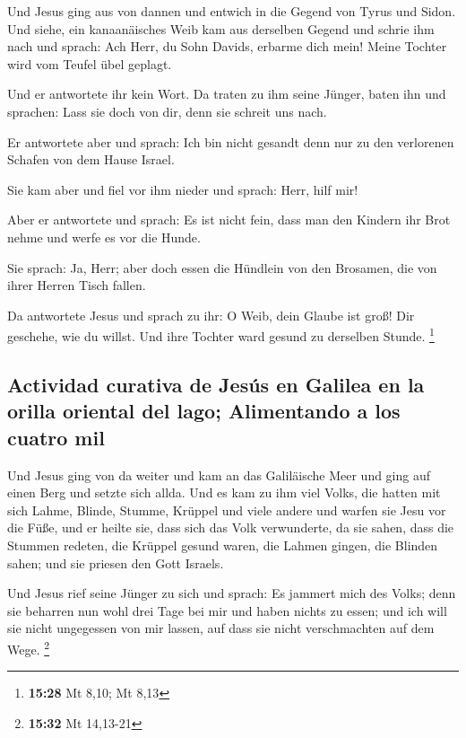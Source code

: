  Und Jesus ging aus von dannen und entwich in die Gegend
von Tyrus und Sidon.  Und siehe, ein kanaanäisches Weib
kam aus derselben Gegend und schrie ihm nach und sprach: Ach Herr, du
Sohn Davids, erbarme dich mein! Meine Tochter wird vom Teufel übel
geplagt.

 Und er antwortete ihr kein Wort. Da traten zu ihm seine
Jünger, baten ihn und sprachen: Lass sie doch von dir, denn sie schreit
uns nach.

 Er antwortete aber und sprach: Ich bin nicht gesandt
denn nur zu den verlorenen Schafen von dem Hause Israel.

 Sie kam aber und fiel vor ihm nieder und sprach: Herr,
hilf mir!

 Aber er antwortete und sprach: Es ist nicht fein, dass
man den Kindern ihr Brot nehme und werfe es vor die Hunde.

 Sie sprach: Ja, Herr; aber doch essen die Hündlein von
den Brosamen, die von ihrer Herren Tisch fallen.

 Da antwortete Jesus und sprach zu ihr: O Weib, dein
Glaube ist groß! Dir geschehe, wie du willst. Und ihre Tochter ward
gesund zu derselben Stunde. \footnote{\textbf{15:28} Mt 8,10; Mt 8,13}

\hypertarget{actividad-curativa-de-jesuxfas-en-galilea-en-la-orilla-oriental-del-lago-alimentando-a-los-cuatro-mil}{%
\subsection{Actividad curativa de Jesús en Galilea en la orilla oriental
del lago; Alimentando a los cuatro
mil}\label{actividad-curativa-de-jesuxfas-en-galilea-en-la-orilla-oriental-del-lago-alimentando-a-los-cuatro-mil}}

 Und Jesus ging von da weiter und kam an das Galiläische
Meer und ging auf einen Berg und setzte sich allda.  Und
es kam zu ihm viel Volks, die hatten mit sich Lahme, Blinde, Stumme,
Krüppel und viele andere und warfen sie Jesu vor die Füße, und er heilte
sie,  dass sich das Volk verwunderte, da sie sahen, dass
die Stummen redeten, die Krüppel gesund waren, die Lahmen gingen, die
Blinden sahen; und sie priesen den Gott Israels.

 Und Jesus rief seine Jünger zu sich und sprach: Es
jammert mich des Volks; denn sie beharren nun wohl drei Tage bei mir und
haben nichts zu essen; und ich will sie nicht ungegessen von mir lassen,
auf dass sie nicht verschmachten auf dem Wege. \footnote{\textbf{15:32}
  Mt 14,13-21}


